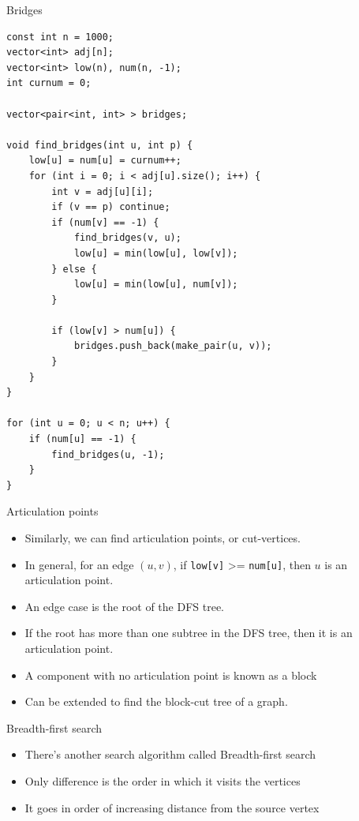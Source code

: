 \documentclass{beamer}
\begin{document}
\begin{frame}{Bridges}
    \begin{verbatim}
const int n = 1000;
vector<int> adj[n];
vector<int> low(n), num(n, -1);
int curnum = 0;

vector<pair<int, int> > bridges;

void find_bridges(int u, int p) {
    low[u] = num[u] = curnum++;
    for (int i = 0; i < adj[u].size(); i++) {
        int v = adj[u][i];
        if (v == p) continue;
        if (num[v] == -1) {
            find_bridges(v, u);
            low[u] = min(low[u], low[v]);
        } else {
            low[u] = min(low[u], num[v]);
        }

        if (low[v] > num[u]) {
            bridges.push_back(make_pair(u, v));
        }
    }
}

for (int u = 0; u < n; u++) {
    if (num[u] == -1) {
        find_bridges(u, -1);
    }
}
    \end{verbatim}
\end{frame}

\begin{frame}[plain]{Articulation points}
    \begin{itemize}
        \item Similarly, we can find articulation points, or cut-vertices.
        \item In general, for an edge $(u, v)$, if \texttt{low[v]} >= \texttt{num[u]}, then $u$ is an articulation point.
        \item An edge case is the root of the DFS tree.
        \item If the root has more than one subtree in the DFS tree, then it is an articulation point.
        \item A component with no articulation point is known as a block
        \item Can be extended to find the block-cut tree of a graph.
    \end{itemize}
\end{frame}

\begin{frame}[plain]{Breadth-first search}
    \vspace{30pt}
    \begin{itemize}
        \item There's another search algorithm called Breadth-first search
        \item Only difference is the order in which it visits the vertices
        \item It goes in order of increasing distance from the source vertex
    \end{itemize}
\end{frame}
\end{document}

